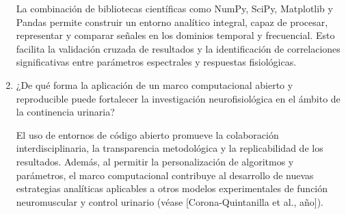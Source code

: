 \begin{enumerate}
	La combinación de bibliotecas científicas como NumPy, SciPy, Matplotlib y Pandas permite construir un entorno analítico integral, capaz de procesar, representar y comparar señales en los dominios temporal y frecuencial. Esto facilita la validación cruzada de resultados y la identificación de correlaciones significativas entre parámetros espectrales y respuestas fisiológicas.
	
	\item ¿De qué forma la aplicación de un marco computacional abierto y reproducible puede fortalecer la investigación neurofisiológica en el ámbito de la continencia urinaria?
	
	El uso de entornos de código abierto promueve la colaboración interdisciplinaria, la transparencia metodológica y la replicabilidad de los resultados. Además, al permitir la personalización de algoritmos y parámetros, el marco computacional contribuye al desarrollo de nuevas estrategias analíticas aplicables a otros modelos experimentales de función neuromuscular y control urinario (véase [Corona-Quintanilla et al., año]).
\end{enumerate}

\goodbreak

